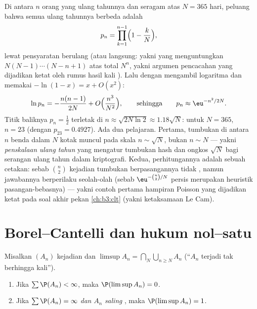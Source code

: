 \begin{example}
\label{ex:b3:probability:birthday}
Di antara $n$ orang yang ulang tahunnya  dan seragam atas
$N = 365$ hari, peluang bahwa semua ulang tahunnya berbeda adalah
\[
p_n = \prod_{k=1}^{n-1}\Bigl(1 - \frac kN\Bigr),
\]
lewat pensyaratan berulang (atau langsung: yakni yang menguntungkan
$N(N-1)\cdots(N - n + 1)$ atas total $N^n$, yakni argumen
pencacahan yang dijadikan ketat oleh rumus hasil kali
). Lalu dengan mengambil logaritma dan memakai $-\ln(1 - x) = x +
O(x^2)$:
\[
\ln p_n = -\frac{n(n-1)}{2N} +
O\Bigl(\frac{n^3}{N^2}\Bigr),
\qquad\text{sehingga}\qquad
p_n \approx \eu^{-n^2/2N} .
\]
Titik baliknya $p_n = \frac12$ terletak di $n \approx
\sqrt{2N\ln2} \approx 1.18\sqrt N$: untuk $N = 365$, $n = 23$
(dengan $p_{23} = 0.4927$). Ada dua pelajaran. Pertama, tumbukan di antara $n$
benda dalam $N$ kotak muncul pada skala $n \sim \sqrt N$, bukan
$n \sim N$ --- yakni \emph{penskalaan ulang tahun} yang mengatur tumbukan
hash dan ongkos $\sqrt N$ bagi serangan ulang tahun dalam
kriptografi. Kedua, perhitungannya adalah sebuah cetakan: sebab
$\binom n2$ kejadian tumbukan berpasangannya tidak , namun
jawabannya berperilaku seolah-olah 
(sebab $\eu^{-\binom n2/N}$ persis merupakan heuristik pasangan-bebasnya)
--- yakni contoh pertama hampiran Poisson yang
dijadikan ketat pada soal akhir pekan \cref{ch:b3:clt}
(yakni ketaksamaan Le Cam).
\end{example}

\section{Borel--Cantelli dan hukum nol--satu}

\begin{theorem}
\label{thm:b3:probability:borelcantelli}
Misalkan $(A_n)$ kejadian dan $\limsup A_n = \bigcap_N
\bigcup_{n\geq N}A_n$ (``$A_n$ terjadi tak berhingga
kali'').
\begin{enumerate}
  \item Jika $\sum\P(A_n) < \infty$, maka $\P(\limsup A_n) =
        0$.
  \item Jika $\sum\P(A_n) = \infty$ \emph{dan $A_n$ saling
        }, maka $\P(\limsup A_n) = 1$.
\end{enumerate}
\end{theorem}

